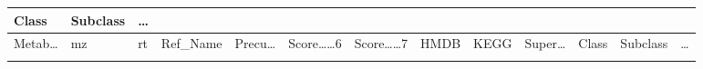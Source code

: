 \documentclass[
]{article}
\begin{document}
\begin{longtable}[]{@{}lllllllllllll@{}}
\begin{minipage}[b]{0.05\columnwidth}
Class\strut
\end{minipage} & \begin{minipage}[b]{0.05\columnwidth}\raggedright
Subclass\strut
\end{minipage} & \begin{minipage}[b]{0.02\columnwidth}\raggedright
\ldots{}\strut
\end{minipage}\tabularnewline
\midrule
\endfirsthead
\toprule
\begin{minipage}[b]{0.05\columnwidth}\raggedright
Metab\ldots{}\strut
\end{minipage} & \begin{minipage}[b]{0.05\columnwidth}\raggedright
mz\strut
\end{minipage} & \begin{minipage}[b]{0.05\columnwidth}\raggedright
rt\strut
\end{minipage} & \begin{minipage}[b]{0.05\columnwidth}\raggedright
Ref\_Name\strut
\end{minipage} & \begin{minipage}[b]{0.05\columnwidth}\raggedright
Precu\ldots{}\strut
\end{minipage} & \begin{minipage}[b]{0.07\columnwidth}\raggedright
Score\ldots\ldots6\strut
\end{minipage} & \begin{minipage}[b]{0.07\columnwidth}\raggedright
Score\ldots\ldots7\strut
\end{minipage} & \begin{minipage}[b]{0.05\columnwidth}\raggedright
HMDB\strut
\end{minipage} & \begin{minipage}[b]{0.04\columnwidth}\raggedright
KEGG\strut
\end{minipage} & \begin{minipage}[b]{0.05\columnwidth}\raggedright
Super\ldots{}\strut
\end{minipage} & \begin{minipage}[b]{0.05\columnwidth}\raggedright
Class\strut
\end{minipage} & \begin{minipage}[b]{0.05\columnwidth}\raggedright
Subclass\strut
\end{minipage} & \begin{minipage}[b]{0.02\columnwidth}\raggedright
\ldots{}\strut
\end{minipage}\tabularnewline
\midrule
\endhead
\begin{minipage}[t]{0.05\columnwidth}\raggedright

\end{minipage}
\end{longtable}
\end{document}
